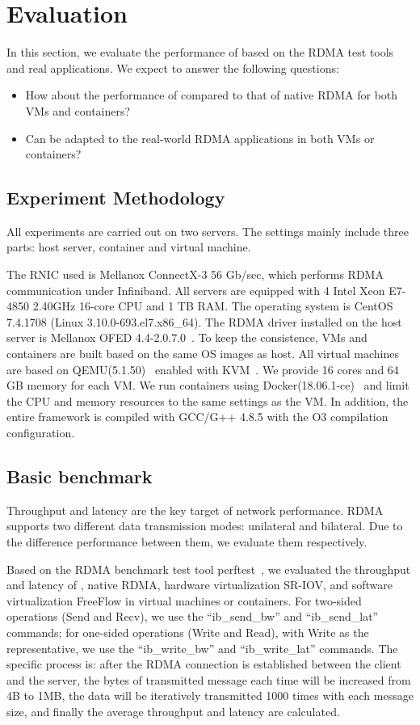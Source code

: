 \section{Evaluation} \label{eval}
In this section, we evaluate the performance of \sys based on the RDMA test tools and real applications. We expect to answer the following questions:

\begin{itemize}
\item How about the performance of \sys compared to that of native RDMA for both VMs and containers?
\item Can \sys be adapted to the real-world RDMA applications in both VMs or containers?
\end{itemize}

\subsection{Experiment Methodology}
All experiments are carried out on two servers. The settings mainly include three parts: host server, container and virtual machine. 


The RNIC used is Mellanox ConnectX-3 56 Gb/sec, which performs RDMA communication under Infiniband. All servers are equipped with 4 Intel Xeon E7-4850 2.40GHz 16-core CPU and 1 TB RAM. The operating system is CentOS 7.4.1708 (Linux 3.10.0-693.el7.x86\_64). The RDMA driver installed on the host server is Mellanox OFED 4.4-2.0.7.0~\cite{mlnx-ofed}. To keep the consistence, VMs and containers are built based on the same OS images as host. All virtual machines are based on QEMU(5.1.50)~\cite{qemu} enabled with KVM~\cite{kvm}. We provide 16 cores and 64 GB memory for each VM. We run containers using Docker(18.06.1-ce)~\cite{docker} and limit the CPU and memory resources to the same settings as the VM. In addition, the entire \sys framework is compiled with GCC/G++ 4.8.5 with the O3 compilation configuration. 


\subsection{Basic benchmark}
Throughput and latency are the key target of network performance. RDMA supports two different data transmission modes: unilateral and bilateral. Due to the difference performance between them, we evaluate them respectively.

Based on the RDMA benchmark test tool perftest~\cite{perftest}, we evaluated the throughput and latency of \sys, native RDMA, hardware virtualization SR-IOV, and software virtualization FreeFlow in virtual machines or containers. For two-sided operations (Send and Recv), we use the ``ib\_send\_bw'' and ``ib\_send\_lat'' commands; for one-sided operations (Write and Read), with Write as the representative, we use the ``ib\_write\_bw'' and ``ib\_write\_lat'' commands. The specific process is: after the RDMA connection is established between the client and the server, the bytes of transmitted message each time will be increased from 4B to 1MB, the data will be iteratively transmitted 1000 times with each message size, and finally the average throughput and latency are calculated.


